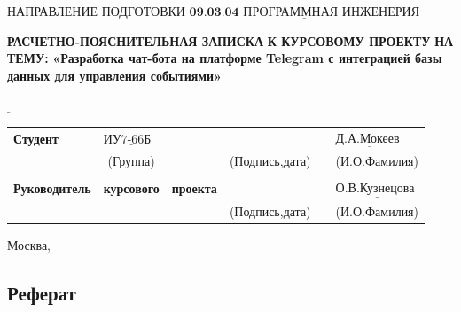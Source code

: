\documentclass[12pt,a4paper,oneside]{report}
\begin{document}
\noindent НАПРАВЛЕНИЕ ПОДГОТОВКИ $\underline{\textbf{09.03.04 ПРОГРАММНАЯ ИНЖЕНЕРИЯ}}$\newline\newline\newline\newline\newline\newline\newline
\begin{center}
    \begin{flushright}
    \Large\textbf{РАСЧЕТНО-ПОЯСНИТЕЛЬНАЯ ЗАПИСКА}\newline
	\Large\textbf{К КУРСОВОМУ ПРОЕКТУ}\newline
	\Large\textbf{НА ТЕМУ:}\newline
	\Large\textbf{«Разработка чат-бота на платформе Telegram с интеграцией базы данных 
для управления событиями»}\newline
	\end{flushright}
\end{center}
\noindent\textbf{} $\underline{\text{}}$\newline\newline\newline\newline

\begin{tabular}{lcp{5em}lp{2em}l}
	\noindent\textbf{Студент} &  $\underline{\text{ИУ7-66Б~~}}$ &             &\hspace{1cm} & & $\underline{\text{Д.А.Мокеев~}}$ \\\cline{4-3}
	 & (Группа) & &(Подпись,дата)  & & (И.О.Фамилия) \\
	 & & & & &\\
	\noindent\textbf{Руководитель} & \textbf{курсового} &  \textbf{проекта}&\hspace{1cm} & &$\underline{\text{О.В.Кузнецова~}}$ \\\cline{4-3} 
	 &  & & (Подпись,дата)  & &(И.О.Фамилия) \\
    \end{tabular}

\begin{center}
	\vfill
	Москва, \the\year
\end{center}
\newpage

\begin{center}
    \section*{Реферат}
\end{center}
\end{document}

